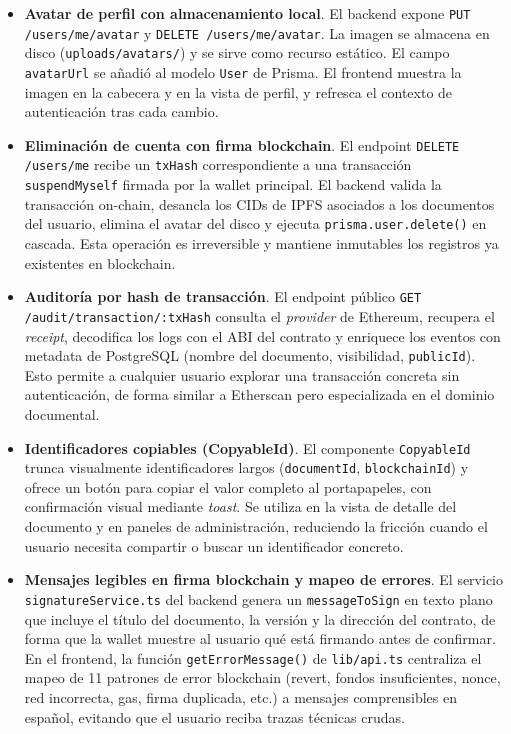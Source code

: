 \documentclass[11pt, a4paper]{article}
\begin{document}
\begin{itemize}
    \item \textbf{Avatar de perfil con almacenamiento local}. El backend expone \texttt{PUT /users/me/avatar} y \texttt{DELETE /users/me/avatar}. La imagen se almacena en disco (\texttt{uploads/avatars/}) y se sirve como recurso estático. El campo \texttt{avatarUrl} se añadió al modelo \texttt{User} de Prisma. El frontend muestra la imagen en la cabecera y en la vista de perfil, y refresca el contexto de autenticación tras cada cambio.
    \item \textbf{Eliminación de cuenta con firma blockchain}. El endpoint \texttt{DELETE /users/me} recibe un \texttt{txHash} correspondiente a una transacción \texttt{suspendMyself} firmada por la wallet principal. El backend valida la transacción on-chain, desancla los CIDs de IPFS asociados a los documentos del usuario, elimina el avatar del disco y ejecuta \texttt{prisma.user.delete()} en cascada. Esta operación es irreversible y mantiene inmutables los registros ya existentes en blockchain.
    \item \textbf{Auditoría por hash de transacción}. El endpoint público \texttt{GET /audit/transaction/:txHash} consulta el \textit{provider} de Ethereum, recupera el \textit{receipt}, decodifica los logs con el ABI del contrato y enriquece los eventos con metadata de PostgreSQL (nombre del documento, visibilidad, \texttt{publicId}). Esto permite a cualquier usuario explorar una transacción concreta sin autenticación, de forma similar a Etherscan pero especializada en el dominio documental.
    \item \textbf{Identificadores copiables (CopyableId)}. El componente \texttt{CopyableId} trunca visualmente identificadores largos (\texttt{documentId}, \texttt{blockchainId}) y ofrece un botón para copiar el valor completo al portapapeles, con confirmación visual mediante \textit{toast}. Se utiliza en la vista de detalle del documento y en paneles de administración, reduciendo la fricción cuando el usuario necesita compartir o buscar un identificador concreto.
    \item \textbf{Mensajes legibles en firma blockchain y mapeo de errores}. El servicio \texttt{signatureService.ts} del backend genera un \texttt{messageToSign} en texto plano que incluye el título del documento, la versión y la dirección del contrato, de forma que la wallet muestre al usuario qué está firmando antes de confirmar. En el frontend, la función \texttt{getErrorMessage()} de \texttt{lib/api.ts} centraliza el mapeo de 11 patrones de error blockchain (revert, fondos insuficientes, nonce, red incorrecta, gas, firma duplicada, etc.) a mensajes comprensibles en español, evitando que el usuario reciba trazas técnicas crudas.
\end{itemize}
\end{document}

